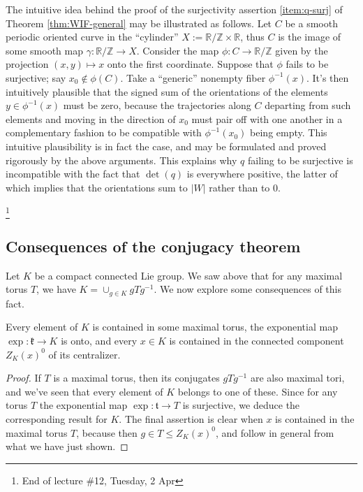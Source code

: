 \documentclass[reqno]{amsart} 
\begin{document}
\begin{remark}
  The intuitive idea behind the proof of the surjectivity assertion \ref{item:q-surj} of Theorem \ref{thm:WIF-general} may be illustrated as follows.  Let $C$ be a smooth periodic oriented curve in the ``cylinder'' $X := \mathbb{R}/\mathbb{Z} \times \mathbb{R}$, thus $C$ is the image of some smooth map $\gamma : \mathbb{R}/\mathbb{Z} \rightarrow X$.  Consider the map $\phi : C \rightarrow \mathbb{R}/\mathbb{Z}$ given by the projection $(x,y) \mapsto x$ onto the first coordinate.  Suppose that $\phi$ fails to be surjective; say $x_0 \notin \phi(C)$.  Take a ``generic'' nonempty fiber $\phi^{-1}(x)$.  It's then intuitively plausible that the signed sum of the orientations of the elements $y \in \phi^{-1}(x)$ must be zero, because the trajectories along $C$ departing from such elements and moving in the direction of $x_0$ must pair off with one another in a complementary fashion to be compatible with $\phi^{-1}(x_0)$ being empty.  This intuitive plausibility is in fact the case, and may be formulated and proved rigorously by the above arguments.  This explains why $q$ failing to be surjective is incompatible with the fact that $\det(q)$ is everywhere positive, the latter of which implies that the orientations sum to $|W|$ rather than to $0$.
\end{remark}
\footnote{End of lecture \#12, Tuesday, 2 Apr}

\subsection{Consequences of the conjugacy theorem}
Let $K$ be a compact connected Lie group.  We saw above that for any maximal torus $T$, we have $K = \cup_{g \in K} g T g^{-1}$.  We now explore some consequences of this fact.

\begin{theorem}\label{thm:exp-onto}
  Every element of $K$ is contained in some maximal torus, the exponential map $\exp : \mathfrak{k} \rightarrow K$ is onto, and every $x \in K$ is contained in the connected component $Z_K(x)^0$ of its centralizer.
\end{theorem}
\begin{proof}
  If $T$ is a maximal torus, then its conjugates $g T g^{-1}$ are also maximal tori, and we've seen that every element of $K$ belongs to one of these.  Since for any torus $T$ the exponential map $\exp : \mathfrak{t} \rightarrow T$ is surjective, we deduce the corresponding result for $K$.  The final assertion is clear when $x$ is contained in the maximal torus $T$, because then $g \in T \leq Z_K(x)^0$, and follow in general from what we have just shown.
\end{proof}
\end{document}

